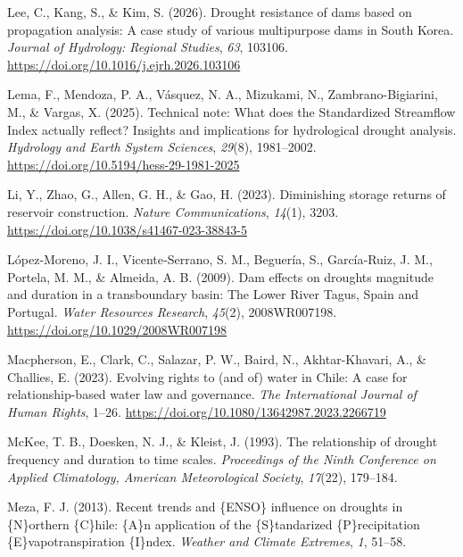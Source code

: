 \documentclass[
]{agujournal2019}
\newlength{\cslhangindent}
\newenvironment{CSLReferences}[2] %
 {\begin{list}{}{%
  \setlength{\itemindent}{0pt}
  \setlength{\leftmargin}{0pt}
  \setlength{\parsep}{0pt}
  \ifodd #1
   \setlength{\leftmargin}{\cslhangindent}
   \setlength{\itemindent}{-1\cslhangindent}
  \fi
  \setlength{\itemsep}{#2\baselineskip}}}
 {\end{list}}
\begin{document}
\begin{CSLReferences}{1}{0}
Lee, C., Kang, S., \& Kim, S. (2026). Drought resistance of dams based
on propagation analysis: {A} case study of various multipurpose dams in
{South} {Korea}. \emph{Journal of Hydrology: Regional Studies},
\emph{63}, 103106. \url{https://doi.org/10.1016/j.ejrh.2026.103106}

Lema, F., Mendoza, P. A., Vásquez, N. A., Mizukami, N.,
Zambrano-Bigiarini, M., \& Vargas, X. (2025). Technical note: {What}
does the {Standardized} {Streamflow} {Index} actually reflect?
{Insights} and implications for hydrological drought analysis.
\emph{Hydrology and Earth System Sciences}, \emph{29}(8), 1981--2002.
\url{https://doi.org/10.5194/hess-29-1981-2025}

Li, Y., Zhao, G., Allen, G. H., \& Gao, H. (2023). Diminishing storage
returns of reservoir construction. \emph{Nature Communications},
\emph{14}(1), 3203. \url{https://doi.org/10.1038/s41467-023-38843-5}

López‐Moreno, J. I., Vicente‐Serrano, S. M., Beguería, S., García‐Ruiz,
J. M., Portela, M. M., \& Almeida, A. B. (2009). Dam effects on droughts
magnitude and duration in a transboundary basin: {The} {Lower} {River}
{Tagus}, {Spain} and {Portugal}. \emph{Water Resources Research},
\emph{45}(2), 2008WR007198. \url{https://doi.org/10.1029/2008WR007198}

Macpherson, E., Clark, C., Salazar, P. W., Baird, N., Akhtar-Khavari,
A., \& Challies, E. (2023). Evolving rights to (and of) water in
{Chile}: A case for relationship-based water law and governance.
\emph{The International Journal of Human Rights}, 1--26.
\url{https://doi.org/10.1080/13642987.2023.2266719}

McKee, T. B., Doesken, N. J., \& Kleist, J. (1993). The relationship of
drought frequency and duration to time scales. \emph{Proceedings of the
Ninth Conference on Applied Climatology, American Meteorological
Society}, \emph{17}(22), 179--184.

Meza, F. J. (2013). Recent trends and \{{ENSO}\} influence on droughts
in \{{N}\}orthern \{{C}\}hile: \{{A}\}n application of the
\{{S}\}tandarized \{{P}\}recipitation \{{E}\}vapotranspiration
\{{I}\}ndex. \emph{Weather and Climate Extremes}, \emph{1}, 51--58.


\end{CSLReferences}
\end{document}
